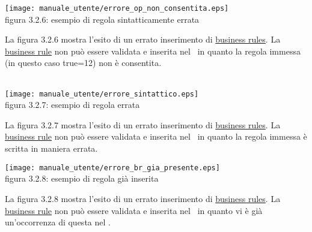 \begin{center}
\texttt{[image: manuale\_utente/errore\_op\_non\_consentita.eps]}\\
 figura 3.2.6: esempio di regola sintatticamente errata 
\end{center} 
La figura 3.2.6 mostra l'esito di un errato inserimento di \underline{business rules}. La \underline{business rule} non pu\`o essere validata e inserita nel \rp\ in quanto la regola immessa (in questo caso true=12) non \`e consentita.
\\
\\
\begin{center}
\texttt{[image: manuale\_utente/errore\_sintattico.eps]}\\
 figura 3.2.7: esempio di regola errata
\end{center} 
La figura 3.2.7 mostra l'esito di un errato inserimento di \underline{business rules}. La \underline{business rule} non pu\`o essere validata e inserita nel \rp\ in quanto la regola immessa \`e scritta in maniera errata.

\begin{center}
\texttt{[image: manuale\_utente/errore\_br\_gia\_presente.eps]}\\
 figura 3.2.8: esempio di regola gi\`a inserita
\end{center} 
La figura 3.2.8 mostra l'esito di un errato inserimento di \underline{business rules}. La \underline{business rule} non pu\`o essere validata e inserita nel \rp\ in quanto vi \`e gi\`a un'occorrenza di questa nel \rp.


